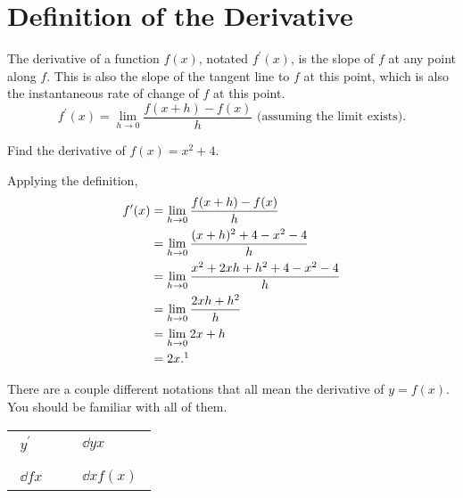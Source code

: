 \section{Definition of the Derivative}
\begin{definition}
	The derivative of a function $f(x)$, notated $f^\prime(x)$, is the slope of $f$ at any point along $f$.
	This is also the slope of the tangent line to $f$ at this point, which is also the instantaneous rate of change of $f$ at this point.
	\begin{equation}
		f^\prime(x) = \lim_{h \to 0}{\frac{f(x+h)-f(x)}{h}} \text{ (assuming the limit exists).}
	\end{equation}
\end{definition}

\begin{example}
	Find the derivative of $f(x)=x^2+4$.
\end{example}
Applying the definition,
\begin{align*}
	f^\prime(x) &= \lim_{h\to 0}{\frac{f(x+h)-f(x)}{h}} \\
	&= \lim_{h \to 0}{\frac{(x+h)^2+4 - x^2 - 4}{h}} \\
	&= \lim_{h \to 0}{\frac{x^2 + 2xh + h^2 + 4 - x^2 - 4}{h}} \\
	&= \lim_{h \to 0}{\frac{2xh + h^2}{h}} \\
	&= \lim_{h\to 0}{2x + h} \\
	&= 2x.\footnotemark
\end{align*}

\noindent
There are a couple different notations that all mean the derivative of $y = f(x)$.
You should be familiar with all of them.
\begin{table}[H]
\begin{center}
\begin{tabular}{ l l l }
	$\begin{aligned}y^\prime\end{aligned}$ & & $\begin{aligned}\dd{y}{x}\end{aligned}$ \\
	& & \\
	$\begin{aligned}\dd{f}{x}\end{aligned}$ & & $\begin{aligned}\dd{}{x}f(x)\end{aligned}$
\end{tabular}
\end{center}
\end{table}

